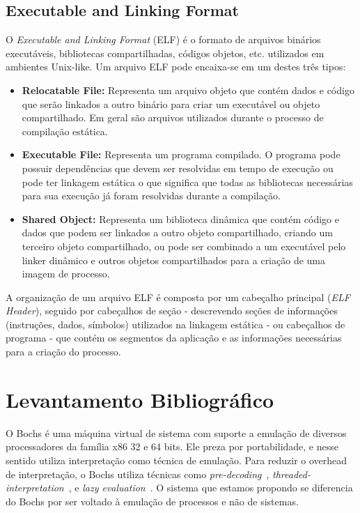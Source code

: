 \documentclass[11pt,twoside]{article}
\begin{document}
\subsection{Executable and Linking Format}

O \emph{Executable and Linking Format} (ELF) \cite{SCO1997} é o formato de arquivos binários executáveis, 
bibliotecas compartilhadas, códigos objetos, etc. utilizados em ambientes Unix-like. Um arquivo ELF pode
encaixa-se em um destes três tipos:

\begin{itemize}
 	\item \textbf{Relocatable File:} Representa um arquivo objeto que contém dados e código que serão linkados 
 	a outro binário para criar um executável ou objeto compartilhado. Em geral são arquivos utilizados durante
 	o processo de compilação estática.
 
 	\item \textbf{Executable File:} Representa um programa compilado. O programa pode possuir dependências que
 	devem ser resolvidas em tempo de execução ou pode ter linkagem estática o que significa que todas as bibliotecas
 	necessárias para sua execução já foram resolvidas durante a compilação.
 
 	\item \textbf{Shared Object:} Representa um biblioteca dinâmica que contém código e dados que podem ser 
 	linkados a outro objeto compartilhado, criando um terceiro objeto compartilhado, ou pode ser combinado a 
 	um executável pelo linker dinâmico e outros objetos compartilhados para a criação de uma imagem de processo.
\end{itemize}

A organização de um arquivo ELF é composta por um cabeçalho principal (\emph{ELF Header}), seguido por cabeçalhos 
de seção - descrevendo seções de informações (instruções, dados, símbolos) utilizados na linkagem estática - ou cabeçalhos 
de programa - que contém os segmentos da aplicação e as informações necessárias para a criação do processo. 







\section{Levantamento Bibliográfico}  \label{sec:bibliografia}

O Bochs \cite{Lawton1996} é uma máquina virtual de sistema com suporte a emulação 
de diversos processadores da família x86 32 e 64 bits. Ele preza por portabilidade, 
e nesse sentido utiliza interpretação como técnica de emulação. Para reduzir o 
overhead de interpretação, o Bochs utiliza técnicas como \emph{pre-decoding}~\cite{Magnusson1994}, 
\emph{threaded-interpretation}~\cite{Klint1981}, e \emph{lazy evaluation}~\cite{Hookway1997}.
O sistema que estamos propondo se diferencia do Bochs por ser voltado à emulação 
de processos e não de sistemas.
\end{document}
